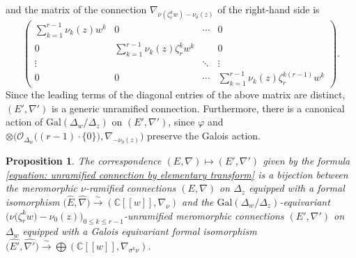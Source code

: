 \documentclass[pdftex]{sigma}
\numberwithin{equation}{section}
\newtheorem{Proposition}[Theorem]{Proposition}
\begin{document}
and the matrix of the connection $\nabla_{\nu(\zeta_r^kw)-\nu_0(z)}$
of the right-hand side is
\[
 \begin{pmatrix}
 \displaystyle \sum_{k=1}^{r-1}\nu_k(z)w^k & 0 & \cdots & 0 \\
 0 & \displaystyle \sum_{k=1}^{r-1}\nu_k(z)\zeta_r^kw^k & & 0 \\
 \vdots & & \ddots & \vdots \\
 0 & 0 & \cdots & \displaystyle \sum_{k=1}^{r-1}\nu_k(z)\zeta_r^{k(r-1)}w^k
 \end{pmatrix}.
\]
Since the leading terms of the diagonal entries of the above matrix
are distinct,
$(E',\nabla')$ is a generic unramified connection.
Furthermore,
there is a canonical action of
$\mathrm{Gal}(\Delta_w/\Delta_z)$
on $(E',\nabla')$,
since $\varphi$ and
$\otimes \big( {\mathcal O}_{\Delta_w}\big((r-1)\cdot\{0\}\big), \nabla_{-\nu_0(z)} \big)$
preserve the Galois action.

\begin{Proposition}
\label{proposition: local correspondence between ramified and unramified connection}
The correspondence
$(E,\nabla)\mapsto
(E',\nabla')$
given by the formula
\eqref{equation: unramified connection by elementary transform}
is a bijection between the meromorphic $\nu$-ramified connections
$(E,\nabla)$ on $\Delta_z$ equipped with
a formal isomorphism
$\big(\widehat{E},\widehat{\nabla}\big)\xrightarrow{\sim}(\mathbb{C}[[w]],\nabla_{\nu})$
and the $\mathrm{Gal}(\Delta_w/\Delta_z)$-equivariant
$\big(\nu\big(\zeta_r^kw\big)-\nu_0(z)\big)_{0\leq k\leq r-1}$-unramified
meromorphic connections
$(E',\nabla')$ on $\Delta_w$ equipped with a Galois equivariant formal isomorphism
$\big(\widehat{E'},\widehat{\nabla'}\big)
\xrightarrow{\sim}
\bigoplus (\mathbb{C}[[w]],\nabla_{\sigma^k\nu})$.
\end{Proposition}
\end{document}
